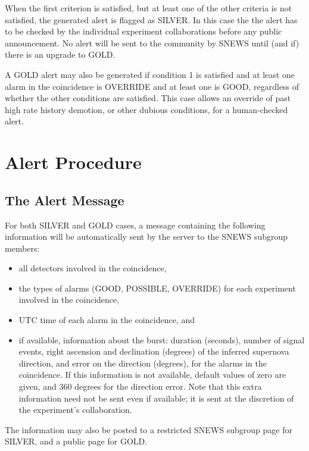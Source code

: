 \documentclass{article}
\begin{document}
When the first criterion is satisfied, but at least one of the other
criteria is not satisfied, the generated alert is flagged as SILVER.
In this case the the alert has to be checked by the individual
experiment collaborations before any public announcement. No alert
will be sent to the community by SNEWS until (and if) there is an
upgrade to GOLD.

A GOLD alert may also be generated if condition 1 is satisfied and
at least one alarm in the coincidence is OVERRIDE and at least one
is GOOD, regardless of whether the other conditions
are satisfied. This case allows an override of past high rate history
demotion, or other dubious conditions,  for a human-checked alert.

\section{Alert Procedure}

\subsection{The Alert Message}

For both SILVER and GOLD cases, a message containing the following
information will be automatically sent by the server to the SNEWS subgroup
members:

\begin{itemize}

\item all detectors involved in the coincidence, 
\item the types of alarms (GOOD, POSSIBLE, OVERRIDE) for each
experiment involved in the coincidence,
\item UTC time of each alarm in the coincidence, and
\item if available, information about the burst: 
duration (seconds), number of signal events, right
ascension and declination (degrees) of the inferred supernova
direction, and error on the direction (degrees), for
the alarms in the coincidence.  If this information is not available,
default values of zero are given, and 360 degrees for the direction
error.  Note that this extra information need not be sent even
if available; it is sent at the discretion of the experiment's
collaboration.



\end{itemize}

The information may also be posted to a restricted SNEWS
subgroup page for SILVER, and a public page for GOLD.
\end{document}
